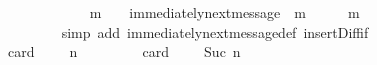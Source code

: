 \begin{isabellebody}
\ \ \ \ \ \ \ \isamarkupfalse%
\ {\isacartoucheopen}{\isasymsigma}{\isacharprime}{\isacharprime}\ {\isasymin}\ {\isasymSigma}\ {\isasymand}\ m\ {\isasymin}\ {\isasymsigma}{\isacharprime}\ {\isasymand}\ immediately{\isacharunderscore}next{\isacharunderscore}message\ {\isacharparenleft}{\isasymsigma}{\isacharprime}{\isacharprime}{\isacharcomma}\ m{\isacharparenright}\ {\isasymand}\ {\isasymsigma}{\isacharprime}\ {\isacharequal}\ {\isasymsigma}{\isacharprime}{\isacharprime}\ {\isasymunion}\ {\isacharbraceleft}m{\isacharbraceright}\ {\isasymand}\ {\isasymsigma}\ {\isasymsubseteq}\ {\isasymsigma}{\isacharprime}{\isacharprime}{\isacartoucheclose}\ {\isacartoucheopen}{\isasymsigma}{\isacharprime}\ {\isasymin}\ {\isasymSigma}\ {\isasymand}\ {\isasymsigma}{\isacharprime}\ {\isasymnoteq}\ {\isasymemptyset}{\isacartoucheclose}\ \ \ \ \ \ \isanewline
\ \ \ \ \ \ \ \isamarkupfalse%
\ {\isacharparenleft}simp\ add{\isacharcolon}\ immediately{\isacharunderscore}next{\isacharunderscore}message{\isacharunderscore}def\ insert{\isacharunderscore}Diff{\isacharunderscore}if{\isacharparenright}\ \isanewline
\ \ \ \ \ \isamarkupfalse%
\ \isamarkupfalse%
\ {\isachardoublequoteopen}card\ {\isacharparenleft}{\isasymsigma}{\isacharprime}{\isacharprime}\ {\isacharminus}\ {\isasymsigma}{\isacharparenright}\ {\isacharequal}\ n{\isachardoublequoteclose}\isanewline
\ \ \ \ \ \ \ \isamarkupfalse%
\ {\isacartoucheopen}card\ {\isacharparenleft}{\isasymsigma}{\isacharprime}\ {\isacharminus}\ {\isasymsigma}{\isacharparenright}\ {\isacharequal}\ Suc\ n{\isacartoucheclose}\isanewline
\ \ \ \ \ \ \ \isamarkupfalse%

\end{isabellebody}
